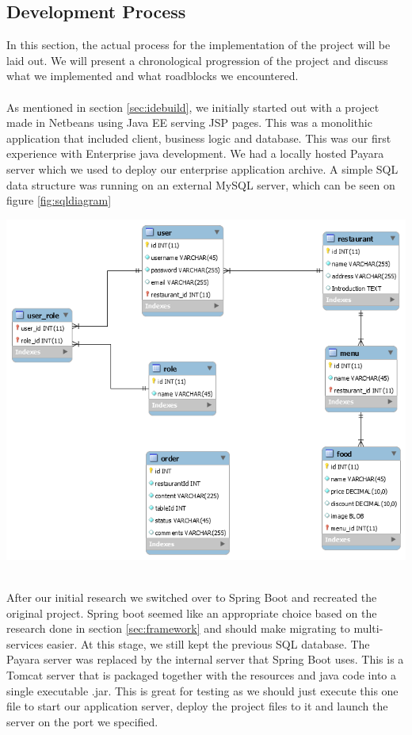 \documentclass[12pt]{article}
\newenvironment{Figure}
	{\par\medskip\noindent\minipage{\linewidth}}
	{\endminipage\par\medskip}
\begin{document}
\begin{multicols}{2}
\subsection{Development Process}
In this section, the actual process for the implementation of the project will be laid out. We will present a chronological progression of the project and discuss what we implemented and what roadblocks we encountered.
\\\\
As mentioned in section \ref{sec:idebuild}, we initially started out with a project made in Netbeans using Java EE serving JSP pages. This was a monolithic application that included client, business logic and database. This was our first experience with Enterprise java development. We had a locally hosted Payara server which we used to deploy our enterprise application archive. A simple SQL data structure was running on an external MySQL server, which can be seen on figure \ref{fig:sqldiagram}
\begin{Figure}
	\centering
	\includegraphics[width=\linewidth]{illustrations/database.png}
	\label{fig:sqldiagram}
\end{Figure}
\noindent \\After our initial research we switched over to Spring Boot and recreated the original project. Spring boot seemed like an appropriate choice based on the research done in section \ref{sec:framework} and should make migrating to multi-services easier. At this stage, we still kept the previous SQL database. The Payara server was replaced by the internal server that Spring Boot uses. This is a Tomcat server that is packaged together with the resources and java code into a single executable .jar. This is great for testing as we should just execute this one file to start our application server, deploy the project files to it and launch the server on the port we specified.

\end{multicols}
\end{document}
